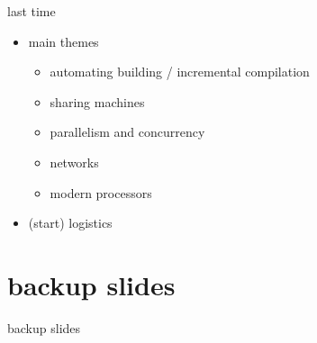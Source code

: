 \date{}
\title{}
\date{}

\begin{frame}
    \titlepage
\end{frame}



\begin{frame}{last time}
    \begin{itemize}
    \item main themes
        \begin{itemize}
        \item automating building / incremental compilation
        \item sharing machines
        \item parallelism and concurrency
        \item networks
        \item modern processors
        \end{itemize}
    \item (start) logistics
    \end{itemize}
\end{frame}




\section{backup slides}
\begin{frame}{backup slides}
\end{frame}


